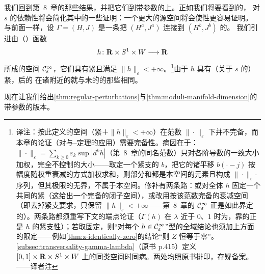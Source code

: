 我们回到第~8~章的那些结果，并把它们\trAdapted{}到带参数的\trFloerEquation{}上。正如我们将要看到的，
对 $s$ 的依赖性将会简化其中的一些证明：一个更大的源空间将会使\trSurjective{}性更容易证明。
与前面一样，设 $\varGamma=(H,J)$ 是一条把 $(H^{a},J^{a})$ 连接到 $(H^{b},J^{b})$ 的\trHomotopy。
我们引进由（\trPerturbation）函数
\[
h\colon\mathbf{R}\times S^{1}\times W\longrightarrow\mathbf{R}
\]
所成的空间 $\mathcal{C}^{\infty}_{\varepsilon}$，它们具有紧\trSupport{}且满足
$\|h\|_{\varepsilon}<+\infty$。\footnote{译注：按此定义的空间（紧\trSupport{}＋$\|h\|_{\varepsilon}<+\infty$）在范数 $\|\cdot\|_{\varepsilon}$ 下并不完备，而本章的\trTransversality{}论证（对\trImplicitFunctionTheorem{}与\trSard--\trSmale{}定理的应用）需要完备性。病因在于：$\|\cdot\|_{\varepsilon}=\sum_{k\ge0}\varepsilon_{k}\sup|d^{k}h|$（第~8~章的同名范数）只对各阶导数的一致大小加权，完全不控制\trSupport{}的大小——取定一个紧支的 $b$，把它的诸平移 $b(\cdot-j)$ 按幅度随权重衰减的方式加权求和，则部分和都是本空间的元素且构成 $\|\cdot\|_{\varepsilon}$-\trCauchy{}序列，但其极限的\trSupport{}无界，不属于本空间。修补有两条路：或对全体 $h$ 固定一个共同的紧\trSupport（这给出一个完备的闭子空间），或改用按该范数完备的衰减空间（即去掉紧支要求，只保留 $\|h\|_{\varepsilon}<+\infty$——第~8~章的 $\mathcal{C}^{\infty}_{\varepsilon}$ 正是如此界定的）。两条路都须重写下文的端点论证（$\varGamma(h)$ 在 $\lambda$ 近于 $0$、$1$ 时为\trStationary，靠的正是 $h$ 的紧支性）；若取固定\trSupport，则“对每个 $h\in\mathcal{C}^{\infty}_{\varepsilon}$”型的全域结论也须加上\trSupport{}方面的限定——例如\cref{thm:z-identically-zero}的结论“则 $Z$ 恒等于零”。\cref{subsec:transversality-gamma-lambda}（原书 p.415）定义 $[0,1]\times\mathbf{R}\times S^{1}\times W$ 上的同类空间时同病。两处均照原书排印，存疑备案。——译者注}由于 $h$ 具有（关于 $s$ 的）紧\trSupport，\trPerturbation{}后的\trHomotopy
{}在诸\trCriticalPoint{}附近的\trFloer\trTrajectory{}就与未\trPerturbation{}的\trHomotopy{}的那些相同。

现在让我们给出\cref{thm:regular-perturbations}与\cref{thm:moduli-manifold-dimension}的
带参数的版本。

